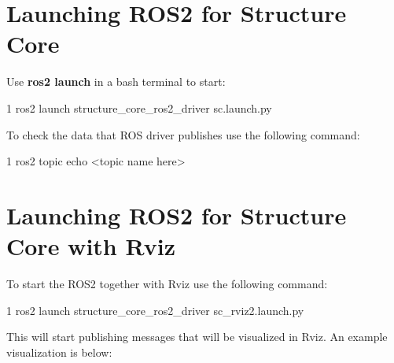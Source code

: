 \hypertarget{ros2_start_launch_ros2}{}\section{Launching R\+O\+S2 for Structure Core}\label{ros2_start_launch_ros2}
Use {\bfseries ros2 launch} in a bash terminal to start\+:


\begin{DoxyCode}
1 ros2 launch structure\_core\_ros2\_driver sc.launch.py
\end{DoxyCode}


To check the data that R\+OS driver publishes use the following command\+:


\begin{DoxyCode}
1 ros2 topic echo <topic name here>
\end{DoxyCode}
\hypertarget{ros2_start_launch_ros2_rviz2}{}\section{Launching R\+O\+S2 for Structure Core with Rviz}\label{ros2_start_launch_ros2_rviz2}
To start the R\+O\+S2 together with Rviz use the following command\+:


\begin{DoxyCode}
1 ros2 launch structure\_core\_ros2\_driver sc\_rviz2.launch.py
\end{DoxyCode}


This will start publishing messages that will be visualized in Rviz. An example visualization is below\+:

 